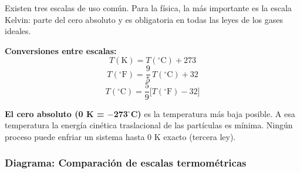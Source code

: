 \begin{seccion}
Existen tres escalas de uso común. Para la física, la más importante es la escala Kelvin: parte del cero absoluto y es obligatoria en todas las leyes de los gases ideales.

\begin{ecuacion}
\textbf{Conversiones entre escalas:}
$$T(\text{K}) = T(^\circ\text{C}) + 273$$
$$T(^\circ\text{F}) = \frac{9}{5}\,T(^\circ\text{C}) + 32$$
$$T(^\circ\text{C}) = \frac{5}{9}\bigl[T(^\circ\text{F}) - 32\bigr]$$
\end{ecuacion}

\begin{nota}
\textbf{El cero absoluto (0 K = $-$273$^\circ$C)} es la temperatura más baja posible. A esa temperatura la energía cinética traslacional de las partículas es mínima. Ningún proceso puede enfriar un sistema hasta 0 K exacto (tercera ley).
\end{nota}
\end{seccion}

\subsubsection{Diagrama: Comparación de escalas termométricas}


